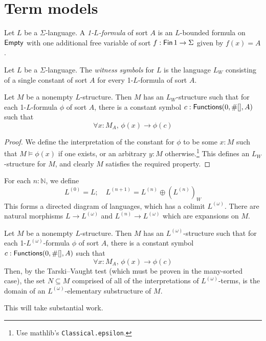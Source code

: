 \section{Term models}
\begin{definition}
  Let \( L \) be a \( \Sigma \)-language.
  A \emph{1-\( L \)-formula} of sort \( A \) is an \( L \)-bounded formula on \( \operatorname{\mathsf{Empty}} \) with one additional free variable of sort \( f : \operatorname{\mathsf{Fin}} 1 \to \Sigma \) given by \( f(x) = A \).
\end{definition}
\begin{definition}
  Let \( L \) be a \( \Sigma \)-language.
  The \emph{witness symbols} for \( L \) is the language \( L_W \) consisting of a single constant of sort \( A \) for every 1-\( L \)-formula of sort \( A \).
\end{definition}
\begin{proposition}
  Let \( M \) be a nonempty \( L \)-structure.
  Then \( M \) has an \( L_W \)-structure such that for each 1-\( L \)-formula \( \phi \) of sort \( A \), there is a constant symbol \( c : \operatorname{\mathsf{Functions}}(0, \#[], A) \) such that
  \[ \forall x : M_A,\, \phi(x) \to \phi(c) \]
\end{proposition}
\begin{proof}
  We define the interpretation of the constant for \( \phi \) to be some \( x : M \) such that \( M \vDash \phi(x) \) if one exists, or an arbitrary \( y : M \) otherwise.\footnote{Use mathlib's \texttt{Classical.epsilon}.}
  This defines an \( L_W \)-structure for \( M \), and clearly \( M \) satisfies the required property.
\end{proof}
\begin{definition}
  For each \( n : \mathbb N \), we define
  \[ L^{(0)} = L;\quad L^{(n+1)} = L^{(n)} \oplus (L^{(n)})_W \]
  This forms a directed diagram of languages, which has a colimit \( L^{(\omega)} \).
  There are natural morphisms \( L \to L^{(\omega)} \) and \( L^{(n)} \to L^{(\omega)} \) which are expansions on \( M \).
\end{definition}
\begin{proposition}
  Let \( M \) be a nonempty \( L \)-structure.
  Then \( M \) has an \( L^{(\omega)} \)-structure such that for each 1-\( L^{(\omega)} \)-formula \( \phi \) of sort \( A \), there is a constant symbol \( c : \operatorname{\mathsf{Functions}}(0, \#[], A) \) such that
  \[ \forall x : M_A,\, \phi(x) \to \phi(c) \]
  Then, by the Tarski--Vaught test (which must be proven in the many-sorted case), the set \( N \subseteq M \) comprised of all of the interpretations of \( L^{(\omega)} \)-terms, is the domain of an \( L^{(\omega)} \)-elementary substructure of \( M \).
\end{proposition}
This will take substantial work.

